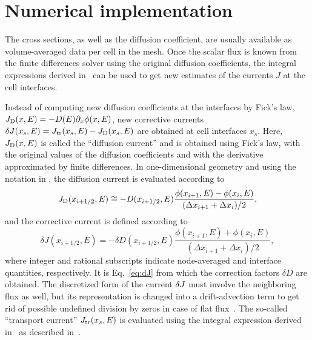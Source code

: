 %
\section{Numerical implementation}
\label{sec:imp}

The cross sections, as well as the diffusion coefficient, are usually available as volume-averaged data per cell in the mesh. Once the scalar flux is known from the finite differences solver using the original diffusion coefficients, the integral expressions derived in~ can be used to get new estimates of the currents $J$ at the cell interfaces. 

Instead of computing new diffusion coefficients at the interfaces by Fick's law, $J_{\textrm{\scriptsize{D}}}(x,E) = -D(E) \partial_x \phi(x,E)$, new corrective currents $\delta J(x_s,E) = J_{\textrm{\scriptsize{tr}}}(x_s,E) - J_{\textrm{\scriptsize{D}}}(x_s,E)$ are obtained at cell interfaces $x_s$. Here, $J_{\textrm{\scriptsize{D}}}(x,E)$ is called the ``diffusion current'' and is obtained using Fick's law, with the original values of the diffusion coefficients and with the derivative approximated by finite differences. In one-dimensional geometry and using the notation in , the diffusion current is evaluated according to
\begin{equation}\label{eq:JD}
J_{\textrm{\scriptsize{D}}}(x_{i+1/2},E) \cong -D(x_{i+1/2},E) 
\frac{\phi(x_{i+1},E) - \phi(x_i,E)}
{(\Delta x_{i+1} + \Delta x_i)/2},
\end{equation}
and the corrective current is defined according to
\begin{equation}\label{eq:dJ}
\delta J(x_{i+1/2},E) = -\delta D(x_{i+1/2},E) 
\frac{\phi(x_{i+1},E) + \phi(x_i,E)}
{(\Delta x_{i+1} + \Delta x_i)/2},
\end{equation}
where integer and rational subscripts indicate node-averaged and interface quantities, respectively. It is Eq.~\eqref{eq:dJ} from which the correction factors $\delta D$ are obtained. The discretized form of the current $\delta J$ must involve the neighboring flux as well, but its representation is changed into a drift-advection term to get rid of possible undefined division by zeros in case of flat flux~\cite{Smith-1983,Tomatis-2011}. The so-called ``transport current'' $J_{\textrm{\scriptsize{tr}}}(x_s,E)$ is evaluated using the integral expression derived in~ as described in~.

